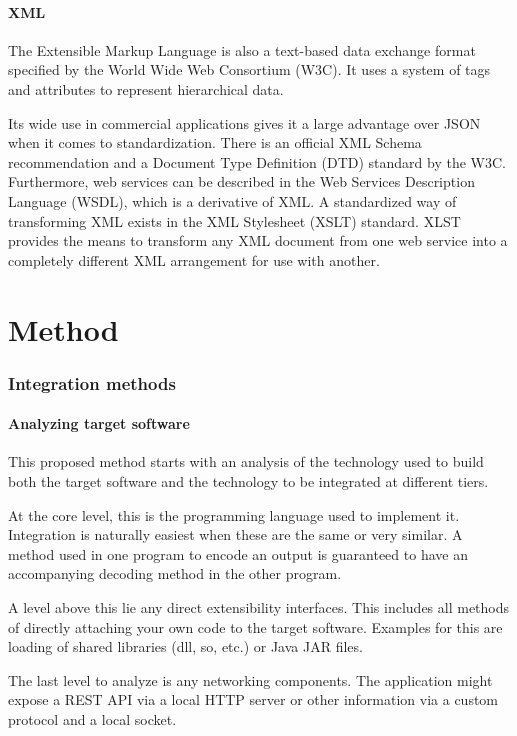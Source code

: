 \documentclass[BSA,Bachelor,english]{twbook}%
\begin{document}
\subsubsection{XML}

The Extensible Markup Language is also a text-based data exchange format specified\cite{XML} by the World Wide Web Consortium (W3C). It uses a system of tags and attributes to represent hierarchical data.

Its wide use in commercial applications gives it a large advantage over JSON when it comes to standardization. There is an official XML Schema recommendation and a Document Type Definition (DTD) standard by the W3C. Furthermore, web services can be described in the Web Services Description Language (WSDL), which is a derivative of XML. A standardized way of transforming XML exists in the XML Stylesheet (XSLT) standard. XLST provides the means to transform any XML document from one web service into a completely different XML arrangement for use with another.

\newpage
\chapter{Method}

\subsection{Integration methods}
\subsubsection{Analyzing target software}
This proposed method starts with an analysis of the technology used to build both the target software and the technology to be integrated at different tiers.

At the core level, this is the programming language used to implement it. Integration is naturally easiest when these are the same or very similar. A method used in one program to encode an output is guaranteed to have an accompanying decoding method in the other program. 

A level above this lie any direct extensibility interfaces. This includes all methods of directly attaching your own code to the target software. Examples for this are loading of shared libraries (dll, so, etc.) or Java JAR files.

The last level to analyze is any networking components. The application might expose a REST API via a local HTTP server or other information via a custom protocol and a local socket.
\end{document}
